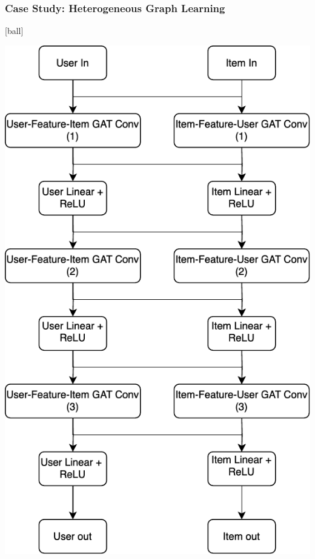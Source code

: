 \documentclass{beamer}
\begin{document}
\begin{frame}[fragile]
\frametitle{Case Study: Heterogeneous Graph Learning}
[ball]

\hspace{3cm}
\begin{minipage}[c]{0.4\textwidth}
    \hspace{1cm}
    \includegraphics[width=\linewidth]{GNN/imgs/HeteroLearning.pdf}
\end{minipage}

\end{frame}
\end{document}
